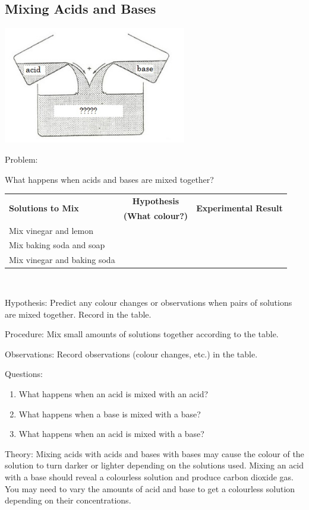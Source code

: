 \pagebreak

\subsection{Mixing Acids and Bases}

\begin{center}
\includegraphics[width=0.6\textwidth]{./img/source/mixing-acid-base.jpg}
\end{center}

\begin{description*}
\item[Problem:]{What happens when acids and bases are mixed together?\\

\begin{tabular}{|l|c|c|} \hline
\multirow{2}{*}{\textbf{Solutions to Mix}} & \textbf{Hypothesis} & \multirow{2}{*}{\textbf{Experimental Result}} \\
& \textbf{(What colour?)} & \\ \hline
Mix vinegar and lemon & & \\ \hline
Mix baking soda and soap & & \\ \hline
Mix vinegar and baking soda & & \\ \hline
\end{tabular}\\[10pt]
}
\item[Hypothesis:]{Predict any colour changes or observations when pairs of solutions are mixed together. Record in the table.}
\item[Procedure:]{Mix small amounts of solutions together according to the table.}
\item[Observations:]{Record observations (colour changes, etc.) in the table.}
\item[Questions:]{\hfill
\begin{enumerate}
\item What happens when an acid is mixed with an acid?
\item What happens when a base is mixed with a base?
\item What happens when an acid is mixed with a base?
\end{enumerate}
}
\item[Theory:]{Mixing acids with acids and bases with bases may cause the colour of the solution to turn darker or lighter depending on the solutions used. Mixing an acid with a base should reveal a colourless solution and produce carbon dioxide gas. You may need to vary the amounts of acid and base to get a colourless solution depending on their concentrations.}
\end{description*}

